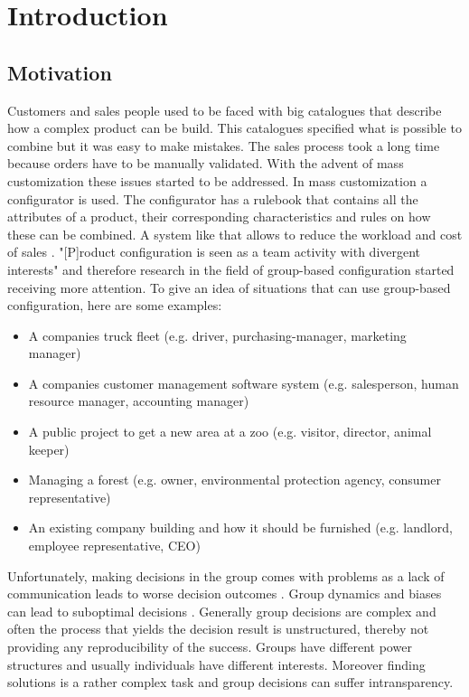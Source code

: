 \chapter{Introduction}
\label{ch:Introduction}

\section{Motivation}
\label{sec:Introduction:Goals}

Customers and sales people used to be faced with big catalogues that describe how a complex product can be build. This catalogues specified what is possible to combine but it was easy to make mistakes. The sales process took a long time because orders have to be manually validated. With the advent of mass customization these issues started to be addressed. In mass customization a configurator is used. The configurator has a rulebook that contains all the attributes of a product, their corresponding characteristics and rules on how these can be combined. A system like that allows to reduce the workload and cost of sales \cite{shafieeCostBenefitAnalysis2018}. "[P]roduct configuration is seen as a team activity with divergent interests" \cite{mendoncaCollaborativeProductConfiguration2008} and therefore research in the field of group-based configuration started receiving more attention. 
To give an idea of situations that can use group-based configuration, here are some examples:
\begin{itemize}
    \item A companies truck fleet (e.g. driver, purchasing-manager, marketing manager)
    \item A companies customer management software system (e.g. salesperson, human resource manager, accounting manager)
    \item A public project to get a new area at a zoo (e.g. visitor, director, animal keeper)
    \item Managing a forest (e.g. owner, environmental protection agency, consumer representative)
    \item An existing company building and how it should be furnished (e.g. landlord, employee representative, CEO)
\end{itemize}

Unfortunately, making decisions in the group comes with problems as a lack of communication leads to worse decision outcomes \cite{atasItemRecommendationUsing2017}. Group dynamics and biases can lead to suboptimal decisions \cite{kerrBiasJudgmentComparing1996}.
Generally group decisions are complex and often the process that yields the decision result is unstructured, thereby not providing any reproducibility of the success. Groups have different power structures and usually individuals have different interests. Moreover finding solutions is a rather complex task and group decisions can suffer intransparency.

